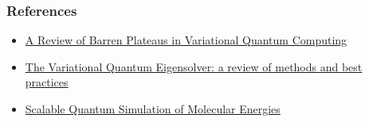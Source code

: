 \documentclass{beamer}
\begin{document}
\begin{frame}
    \frametitle{References}
    \begin{itemize}
        \item \href{https://arxiv.org/pdf/2405.00781}{A Review of Barren Plateaus in Variational Quantum Computing}
        \item \href{https://arxiv.org/pdf/2111.05176}{The Variational Quantum Eigensolver: a review of methods and best practices}
        \item \href{https://journals.aps.org/prx/abstract/10.1103/PhysRevX.6.031007}{Scalable Quantum Simulation of Molecular Energies}
    \end{itemize}
\end{frame}
\end{document}
